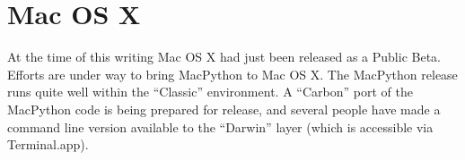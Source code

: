 
 

 

\section{Mac OS X}

At the time of this writing Mac OS X had just been released as a
Public Beta. Efforts are under way to bring MacPython to Mac OS X. The
MacPython release  runs quite well within the
``Classic'' environment.  A ``Carbon'' port of the MacPython code is
being prepared for release, and several people have made a command
line version available to the ``Darwin'' layer (which is accessible
via Terminal.app).
